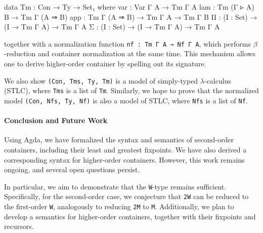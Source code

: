 \documentclass{easychair}
\begin{document}
\begin{code}
data Tm : Con → Ty → Set₁ where
  var : Var Γ A → Tm Γ A
  lam : Tm (Γ ▹ A) B → Tm Γ (A ⇒ B)
  app : Tm Γ (A ⇒ B) → Tm Γ A → Tm Γ B
  Π : (I : Set) → (I → Tm Γ A) → Tm Γ A
  Σ : (I : Set) → (I → Tm Γ A) → Tm Γ A
\end{code}

\noindent
together with a normalization function \texttt{nf : Tm Γ A → Nf Γ A}, 
which performs $\beta$-reduction and container normalization at the same time.
This mechanism allows one to derive higher-order container by spelling out its signature.

We also show \texttt{(Con, Tms, Ty, Tm)} is a model of simply-typed
$\lambda$-calculus (STLC), where \texttt{Tms} is a list of \texttt{Tm}. Similarly, we hope
to prove that the normalized model \texttt{(Con, Nfs, Ty, Nf)} is also a model of STLC, where
\texttt{Nfs} is a list of \texttt{Nf}.

\paragraph{Conclusion and Future Work}
Using Agda, we have formalized the syntax and semantics of second-order containers, including their least and greatest fixpoints. We have also derived a corresponding syntax for higher-order containers. However, this work remains ongoing, and several open questions persist.

In particular, we aim to demonstrate that the \texttt{W}-type remains sufficient. Specifically, for the second-order case, we conjecture that \texttt{2W} can be reduced to the first-order \texttt{W}, analogously to reducing \texttt{2M} to \texttt{M}. Additionally, we plan to develop a semantics for higher-order containers, together with their fixpoints and recursors.




\end{document}
